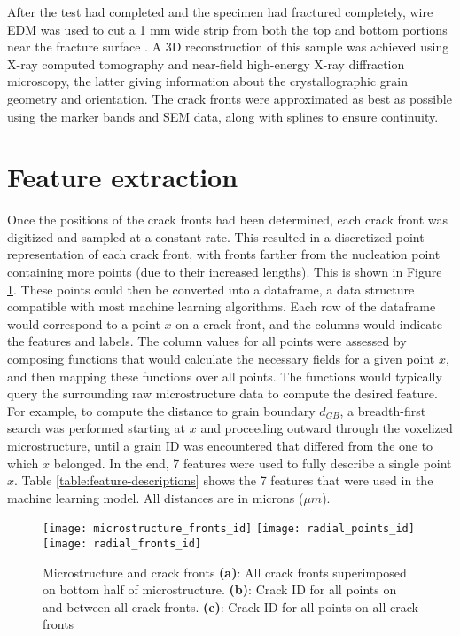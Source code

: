 After the test had completed and the specimen had fractured completely, wire EDM was used to cut a 1 mm wide strip from both the top and bottom portions near the fracture surface \cite{spear2014}.  A 3D reconstruction of this sample was achieved using X-ray computed tomography and near-field high-energy X-ray diffraction microscopy, the latter giving information about the crystallographic grain geometry and orientation.  The crack fronts were approximated as best as possible using the marker bands and SEM data, along with splines to ensure continuity.

\section{Feature extraction}
Once the positions of the crack fronts had been determined, each crack front was digitized and sampled at a constant rate.  This resulted in a discretized point-representation of each crack front, with fronts farther from the nucleation point containing more points (due to their increased lengths).  This is shown in Figure \ref{fig:crack_fronts}.  These points could then be converted into a dataframe, a data structure compatible with most machine learning algorithms.  Each row of the dataframe would correspond to a point $x$ on a crack front, and the columns would indicate the features and labels.  The column values for all points were assessed by composing functions that would calculate the necessary fields for a given point $x$, and then mapping these functions over all points.  The functions would typically query the surrounding raw microstructure data to compute the desired feature.  For example, to compute the distance to grain boundary $d_{GB}$, a breadth-first search was performed starting at $x$ and proceeding outward through the voxelized microstructure, until a grain ID was encountered that differed from the one to which $x$ belonged.  In the end, 7 features were used to fully describe a single point $x$.  Table \ref{table:feature-descriptions} shows the 7 features that were used in the machine learning model.  All distances are in microns ($\mu m$).

\begin{figure}[p]
  \centering
    \texttt{[image: microstructure\_fronts\_id]}
    \texttt{[image: radial\_points\_id]}
    \texttt{[image: radial\_fronts\_id]}

    \caption{Microstructure and crack fronts \textbf{(a)}: All crack fronts superimposed on bottom half of microstructure.
             \textbf{(b)}: Crack ID for all points on and between all crack fronts.
             \textbf{(c)}: Crack ID for all points on all crack fronts}
  \label{fig:crack_fronts}
\end{figure}

